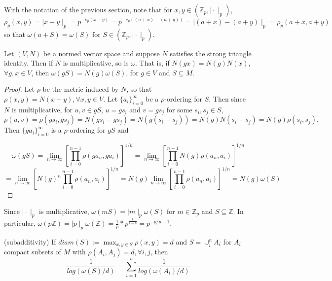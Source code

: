 \begin{example}
	With the notation of the previous section, note that for $x,y \in (\mathbb{Z}_p, \mid \cdot \mid_p)$, $\rho_p(x,y) = \mid x - y \mid_p = p^{-\nu_p(x-y)} = p^{-\nu_p((a+x)-(a+y))} =  \mid (a+x) - (a+y) \mid_p = \rho_p(a+x,a+y)$ so that $\omega(a+S) = \omega(S)$ for $S \in (\mathbb{Z}_p, \mid \cdot \mid_p)$.
\end{example}

\begin{proposition*}
	Let $(V, N)$ be a normed vector space and suppose $N$ satisfies the strong triangle identity. Then if $N$ is multiplicative, so is $\omega$. That is, if $N(gx)=N(g)N(x)$,$\forall g,x \in V$, then $\omega(gS) = N(g)  \omega(S)$, for $g \in V$ and $S \subseteq M$. 
\end{proposition*}

\begin{proof}
	Let $\rho$ be the metric induced by $N$, so that $\rho(x,y) = N(x-y), \forall x,y \in V$. Let $\{a_i\}_{i=0}^\infty$ be a $\rho$-ordering for $S$. Then since $N$ is multiplicative, for $u, v \in gS$, $u=gs_i$ and $v=gs_j$ for some $s_i, s_j \in S$,  $$\rho(u, v) = \rho(gs_i, gs_j) =N(gs_i - gs_j) = N(g(s_i - s_j)) = N(g)N(s_i - s_j) = N(g)\rho(s_i,s_j).$$
	Then $\{ga_i\}_{i=0}^\infty$ is a $\rho$-ordering for $gS$ and 
	
	$$\omega(gS) = \lim_{n\to\infty} [\prod_{i=0}^{n-1} \rho(ga_n,ga_i)]^{1/n} 
	= \lim_{n\to\infty} [\prod_{i=0}^{n-1} N(g)\rho(a_n,a_i)]^{1/n} $$
	$$= \lim_{n\to\infty} [N(g)^n\prod_{i=0}^{n-1} \rho(a_n,a_i)]^{1/n} = N(g) \lim_{n\to\infty} [\prod_{i=0}^{n-1} \rho(a_n,a_i)]^{1/n} = N(g) \omega(S)$$
\end{proof}


\begin{example}
	Since $\mid \cdot \mid_p$ is multiplicative, $\omega(mS) = \mid m \mid_p  \omega(S)$ for $m \in \mathbb{Z}_p$ and $S \subseteq \mathbb{Z}$. In particular, $\omega(p\mathbb{Z}) = \mid p \mid_p \omega(\mathbb{Z}) = \frac{1}{p}*p^{\frac{1}{1-p}} = p^{-p/p-1}.$
\end{example}


\begin{proposition*}
	\cite{kj}(subadditivity) If  $diam(S) := \max_{x,y \in S} \rho(x,y)=d$ and $S=\cup_i^n A_i$ for $A_i$ compact subsets of $M$ with $\rho(A_i, A_j)=d, \forall i,j$, then \[\frac{1}{log(\omega(S)/d) } = \sum_{i=1}^n \frac{1}{log(\omega(A_i)/d)}\] 
\end{proposition*}

